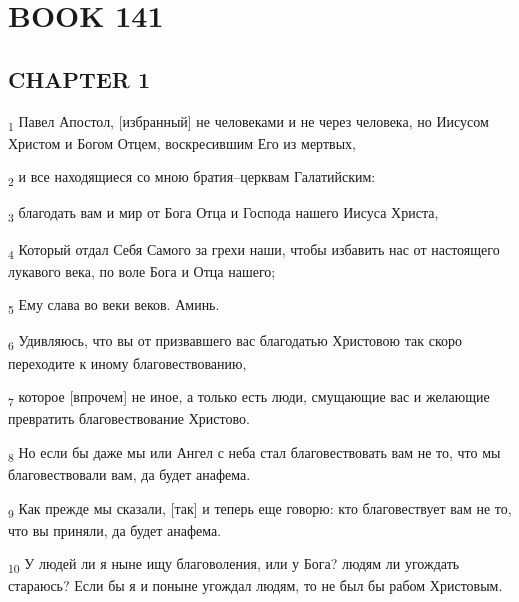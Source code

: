 \section{BOOK 141}
\subsection{CHAPTER 1}
\begin{tcolorbox}
\textsubscript{1} Павел Апостол, [избранный] не человеками и не через человека, но Иисусом Христом и Богом Отцем, воскресившим Его из мертвых,
\end{tcolorbox}
\begin{tcolorbox}
\textsubscript{2} и все находящиеся со мною братия--церквам Галатийским:
\end{tcolorbox}
\begin{tcolorbox}
\textsubscript{3} благодать вам и мир от Бога Отца и Господа нашего Иисуса Христа,
\end{tcolorbox}
\begin{tcolorbox}
\textsubscript{4} Который отдал Себя Самого за грехи наши, чтобы избавить нас от настоящего лукавого века, по воле Бога и Отца нашего;
\end{tcolorbox}
\begin{tcolorbox}
\textsubscript{5} Ему слава во веки веков. Аминь.
\end{tcolorbox}
\begin{tcolorbox}
\textsubscript{6} Удивляюсь, что вы от призвавшего вас благодатью Христовою так скоро переходите к иному благовествованию,
\end{tcolorbox}
\begin{tcolorbox}
\textsubscript{7} которое [впрочем] не иное, а только есть люди, смущающие вас и желающие превратить благовествование Христово.
\end{tcolorbox}
\begin{tcolorbox}
\textsubscript{8} Но если бы даже мы или Ангел с неба стал благовествовать вам не то, что мы благовествовали вам, да будет анафема.
\end{tcolorbox}
\begin{tcolorbox}
\textsubscript{9} Как прежде мы сказали, [так] и теперь еще говорю: кто благовествует вам не то, что вы приняли, да будет анафема.
\end{tcolorbox}
\begin{tcolorbox}
\textsubscript{10} У людей ли я ныне ищу благоволения, или у Бога? людям ли угождать стараюсь? Если бы я и поныне угождал людям, то не был бы рабом Христовым.
\end{tcolorbox}
